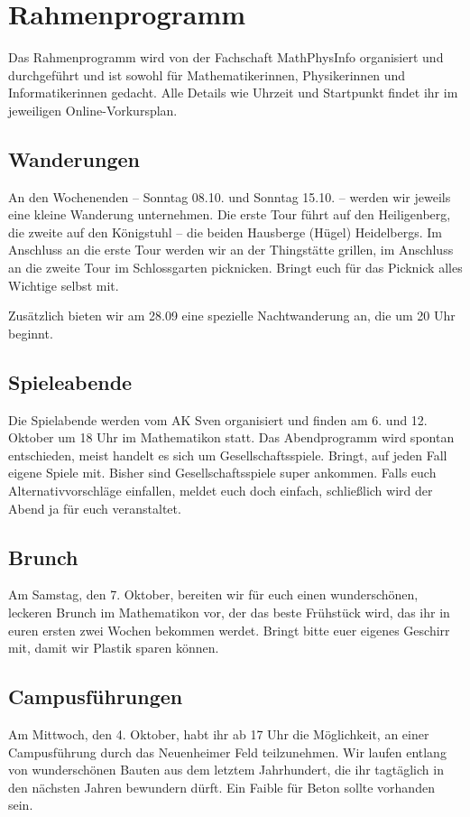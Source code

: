 \newpage
\section{Rahmenprogramm}

Das Rahmenprogramm wird von der Fachschaft MathPhysInfo organisiert und durchgeführt und ist sowohl für Mathematikerinnen, Physikerinnen und Informatikerinnen gedacht. Alle Details wie Uhrzeit und Startpunkt findet ihr im jeweiligen Online-Vorkursplan.

\subsection{Wanderungen}
An den Wochenenden -- Sonntag 08.10. und Sonntag 15.10. -- werden wir jeweils eine kleine Wanderung unternehmen. Die erste Tour führt auf den Heiligenberg, die zweite auf den Königstuhl -- die beiden Hausberge (Hügel) Heidelbergs. Im Anschluss an die erste Tour werden wir an der Thingstätte grillen, im Anschluss an die zweite Tour im Schlossgarten picknicken. Bringt euch für das Picknick alles Wichtige selbst mit.

Zusätzlich bieten wir am 28.09 eine spezielle Nachtwanderung an, die um 20 Uhr beginnt.

\subsection{Spieleabende}
Die Spielabende werden vom AK Sven organisiert und finden am 6. und 12. Oktober um 18 Uhr im \gls{Mathematikon} statt. Das Abendprogramm wird spontan entschieden, meist handelt es sich um Gesellschaftsspiele. Bringt, auf jeden Fall eigene Spiele mit. Bisher sind Gesellschaftsspiele super ankommen. Falls euch Alternativvorschläge einfallen, meldet euch doch einfach, schließlich wird der Abend ja für euch veranstaltet.

\subsection{Brunch}
Am Samstag, den 7. Oktober, bereiten wir für euch einen wunderschönen, leckeren Brunch im \gls{Mathematikon} vor, der das beste Frühstück wird, das ihr in euren ersten zwei Wochen bekommen werdet. Bringt bitte euer eigenes Geschirr mit, damit wir Plastik sparen können.

\subsection{Campusführungen}
Am Mittwoch, den 4. Oktober, habt ihr ab 17 Uhr die Möglichkeit, an einer Campusführung durch das Neuenheimer Feld teilzunehmen. Wir laufen entlang von wunderschönen Bauten aus dem letztem Jahrhundert, die ihr tagtäglich in den nächsten Jahren bewundern dürft. Ein Faible für Beton sollte vorhanden sein.

